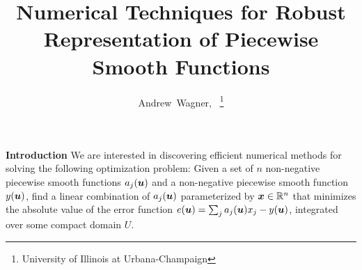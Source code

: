 \documentclass[12pt,journal,draftcls,letterpaper,onecolumn]{IEEEtran}
\begin{document}
%
\title{Numerical Techniques for Robust Representation of Piecewise Smooth Functions}

\author{Andrew~Wagner,~
\thanks{University of Illinois at Urbana-Champaign}}%





\maketitle





{\bf Introduction}
We are interested in discovering efficient numerical methods for solving the following optimization problem:  Given a set of $n$ non-negative piecewise smooth functions $a_j(\boldsymbol{u})$ and a non-negative piecewise smooth function $y(\boldsymbol{u})$,  find a linear combination of $a_j(\boldsymbol{u})$ parameterized by ${\boldsymbol{x}} \in \mathbb R^n$ that minimizes the absolute value of the error function $e(\boldsymbol{u}) = \sum_ja_j(\boldsymbol{u}) x_j - y(\boldsymbol{u})$, integrated over some compact domain $U$.
\end{document}

